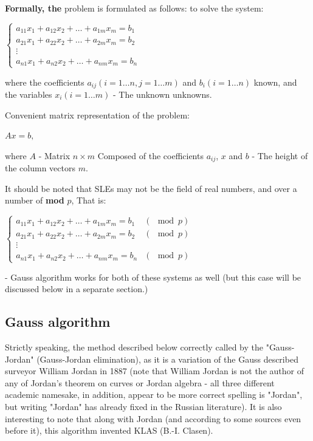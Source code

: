 \textbf{Formally, the} problem is formulated as follows: to solve the system:

$\begin{cases}
a_{11}x_{1}+a_{12}x_{2}+\ldots+a_{1m}x_{m}=b_{1}\\
a_{21}x_{1}+a_{22}x_{2}+\ldots+a_{2m}x_{m}=b_{2}\\
\vdots\\
a_{n1}x_{1}+a_{n2}x_{2}+\ldots+a_{nm}x_{m}=b_{n}
\end{cases}$

where the coefficients $a_ {ij} (i = 1 \ldots n, j = 1 \ldots m)$ and $b_i (i = 1 \ldots n)$ known, and the variables $x_i (i = 1 \ldots m)$ - The unknown unknowns.

Convenient matrix representation of the problem:

$A x = b,$

where $A$ - Matrix $n \times m$ Composed of the coefficients $a_ {ij}$, $x$ and $b$ - The height of the column vectors $m$.

It should be noted that SLEs may not be the field of real numbers, and over a number of \textbf{mod} $p$, That is:

$\begin{cases}
a_{11}x_{1}+a_{12}x_{2}+\ldots+a_{1m}x_{m}=b_{1} & (\mod p)\\
a_{21}x_{1}+a_{22}x_{2}+\ldots+a_{2m}x_{m}=b_{2} & (\mod p)\\
\vdots\\
a_{n1}x_{1}+a_{n2}x_{2}+\ldots+a_{nm}x_{m}=b_{n} & (\mod p)
\end{cases}$

- Gauss algorithm works for both of these systems as well (but this case will be discussed below in a separate section.)

\subsection{ Gauss algorithm }

Strictly speaking, the method described below correctly called by the "Gauss-Jordan" (Gauss-Jordan elimination), as it is a variation of the Gauss described surveyor William Jordan in 1887 (note that William Jordan is not the author of any of Jordan's theorem on curves or Jordan algebra - all three different academic namesake, in addition, appear to be more correct spelling is "Jordan", but writing "Jordan" has already fixed in the Russian literature). It is also interesting to note that along with Jordan (and according to some sources even before it), this algorithm invented KLAS (B.-I. Clasen).

